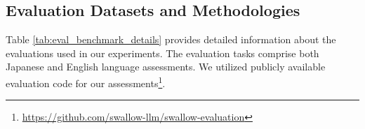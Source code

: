 
\subsection{Evaluation Datasets and Methodologies}
\label{appendix:evaluation_details}

Table \ref{tab:eval_benchmark_details} provides detailed information about the evaluations used in our experiments. The evaluation tasks comprise both Japanese and English language assessments. We utilized publicly available evaluation code for our assessments\footnote{\url{https://github.com/swallow-llm/swallow-evaluation}}.

